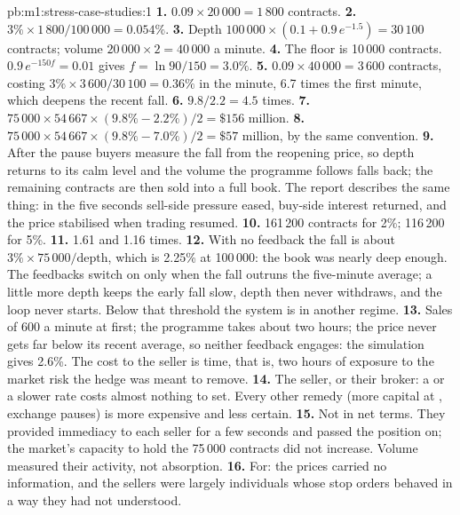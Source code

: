 \begin{solution}{pb:m1:stress-case-studies:1}
\textbf{1.} $0.09 \times 20\,000 = 1\,800$ contracts.
\textbf{2.} $3\% \times 1\,800/100\,000 = 0.054\%$.
\textbf{3.} Depth $100\,000 \times (0.1 + 0.9\,e^{-1.5}) = 30\,100$ contracts; volume
$20\,000 \times 2 = 40\,000$ a minute.
\textbf{4.} The floor is 10\,000 contracts. $0.9\,e^{-150 f} = 0.01$ gives $f =
\ln 90/150 = 3.0\%$.
\textbf{5.} $0.09 \times 40\,000 = 3\,600$ contracts, costing $3\% \times 3\,600/30\,100 =
0.36\%$ in the minute, 6.7 times the first minute, which deepens the recent
fall.
\textbf{6.} $9.8/2.2 = 4.5$ times.
\textbf{7.} $75\,000 \times 54\,667 \times (9.8\% - 2.2\%)/2 = \$156$ million.
\textbf{8.} $75\,000 \times 54\,667 \times (9.8\% - 7.0\%)/2 = \$57$ million, by the same
convention.
\textbf{9.} After the pause buyers measure the fall from the reopening price, so
depth returns to its calm level and the volume the programme follows falls
back; the remaining contracts are then sold into a full book. The report
describes the same thing: in the five seconds sell-side pressure eased,
buy-side interest returned, and the price stabilised when trading resumed.
\textbf{10.} 161\,200 contracts for 2\%; 116\,200 for 5\%.
\textbf{11.} 1.61 and 1.16 times.
\textbf{12.} With no feedback the fall is about $3\% \times 75\,000/\text{depth}$, which
is 2.25\% at 100\,000: the book was nearly deep enough. The feedbacks switch
on only when the fall outruns the five-minute average; a little more depth
keeps the early fall slow, depth then never withdraws, and the loop never
starts. Below that threshold the system is in another regime.
\textbf{13.} Sales of 600 a minute at first; the programme takes about two hours;
the price never gets far below its recent average, so neither feedback
engages: the simulation gives 2.6\%. The cost to the seller is time, that is,
two hours of exposure to the market risk the hedge was meant to remove.
\textbf{14.} The seller, or their broker: a  or a slower rate costs
almost nothing to set. Every other remedy (more capital at ,
exchange pauses) is more expensive and less certain.
\textbf{15.} Not in net terms. They provided immediacy to each seller for a few
seconds and passed the position on; the market's capacity to hold the 75\,000
contracts did not increase. Volume measured their activity, not absorption.
\textbf{16.} For: the prices carried no information, and the sellers were largely
individuals whose stop orders behaved in a way they had not understood.

\end{solution}
